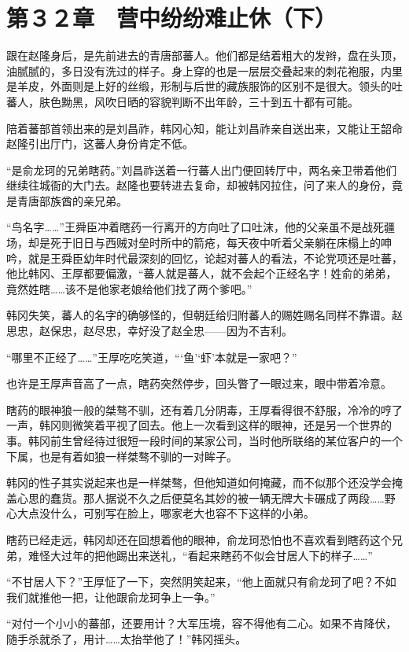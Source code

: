 \section{第３２章　营中纷纷难止休（下）}

跟在赵隆身后，是先前进去的青唐部蕃人。他们都是结着粗大的发辫，盘在头顶，油腻腻的，多日没有洗过的样子。身上穿的也是一层层交叠起来的刺花袍服，内里是羊皮，外面则是上好的丝缎，形制与后世的藏族服饰的区别不是很大。领头的吐蕃人，肤色黝黑，风吹日晒的容貌判断不出年龄，三十到五十都有可能。

陪着蕃部首领出来的是刘昌祚，韩冈心知，能让刘昌祚亲自送出来，又能让王韶命赵隆引出厅门，这蕃人身份肯定不低。

“是俞龙珂的兄弟瞎药。”刘昌祚送着一行蕃人出门便回转厅中，两名亲卫带着他们继续往城衙的大门去。赵隆也要转进去复命，却被韩冈拉住，问了来人的身份，竟是青唐部族酋的亲兄弟。

“鸟名字……”王舜臣冲着瞎药一行离开的方向吐了口吐沫，他的父亲虽不是战死疆场，却是死于旧日与西贼对垒时所中的箭疮，每天夜中听着父亲躺在床榻上的呻吟，就是王舜臣幼年时代最深刻的回忆，论起对蕃人的看法，不论党项还是吐蕃，他比韩冈、王厚都要偏激，“蕃人就是蕃人，就不会起个正经名字！姓俞的弟弟，竟然姓瞎……该不是他家老娘给他们找了两个爹吧。”

韩冈失笑，蕃人的名字的确够怪的，但朝廷给归附蕃人的赐姓赐名同样不靠谱。赵思忠，赵保忠，赵尽忠，幸好没了赵全忠——因为不吉利。

“哪里不正经了……”王厚吃吃笑道，“‘鱼’‘虾’本就是一家吧？”

也许是王厚声音高了一点，瞎药突然停步，回头瞥了一眼过来，眼中带着冷意。

瞎药的眼神狼一般的桀骜不驯，还有着几分阴毒，王厚看得很不舒服，冷冷的哼了一声，韩冈则微笑着平视了回去。他上一次看到这样的眼神，还是另一个世界的事。韩冈前生曾经待过很短一段时间的某家公司，当时他所联络的某位客户的一个下属，也是有着如狼一样桀骜不驯的一对眸子。

韩冈的性子其实说起来也是一样桀骜，但他知道如何掩藏，而不似那个还没学会掩盖心思的蠢货。那人据说不久之后便莫名其妙的被一辆无牌大卡碾成了两段……野心大点没什么，可别写在脸上，哪家老大也容不下这样的小弟。

瞎药已经走远，韩冈却还在回想着他的眼神，俞龙珂恐怕也不喜欢看到瞎药这个兄弟，难怪大过年的把他踢出来送礼，“看起来瞎药不似会甘居人下的样子……”

“不甘居人下？”王厚怔了一下，突然阴笑起来，“他上面就只有俞龙珂了吧？不如我们就推他一把，让他跟俞龙珂争上一争。”

“对付一个小小的蕃部，还要用计？大军压境，容不得他有二心。如果不肯降伏，随手杀就杀了，用计……太抬举他了！”韩冈摇头。

